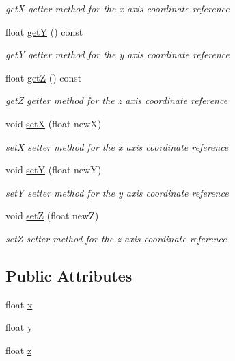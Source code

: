 \begin{DoxyCompactItemize}
\begin{DoxyCompactList}\small\item\em getX getter method for the x axis coordinate reference \end{DoxyCompactList}\item 
float \hyperlink{class_point_a2371ffadbe245d12a8f556d0a976521b}{getY} () const
\begin{DoxyCompactList}\small\item\em getY getter method for the y axis coordinate reference \end{DoxyCompactList}\item 
float \hyperlink{class_point_a9bb9987e32b7dd8dec81ead5d428446c}{getZ} () const
\begin{DoxyCompactList}\small\item\em getZ getter method for the z axis coordinate reference \end{DoxyCompactList}\item 
void \hyperlink{class_point_a337d4410acd500f972f87f4fc73a43fe}{setX} (float newX)
\begin{DoxyCompactList}\small\item\em setX setter method for the x axis coordinate reference \end{DoxyCompactList}\item 
void \hyperlink{class_point_ad77207403cf0e51641b7bc500d351e3f}{setY} (float newY)
\begin{DoxyCompactList}\small\item\em setY setter method for the y axis coordinate reference \end{DoxyCompactList}\item 
void \hyperlink{class_point_a82621ca550dece2b002d8fb5d7b17221}{setZ} (float newZ)
\begin{DoxyCompactList}\small\item\em setZ setter method for the z axis coordinate reference \end{DoxyCompactList}\end{DoxyCompactItemize}
\subsection*{Public Attributes}
\begin{DoxyCompactItemize}
\item 
float \hyperlink{class_point_a05dfe2dfbde813ad234b514f30e662f1}{x}
\item 
float \hyperlink{class_point_a6101960c8d2d4e8ea1d32c9234bbeb8d}{y}
\item 
float \hyperlink{class_point_a9a666531e0e99adff132be93d2407d0c}{z}
\end{DoxyCompactItemize}


